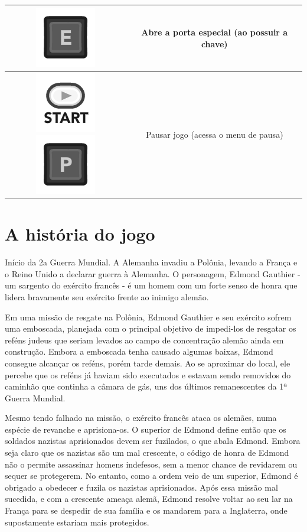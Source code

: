 \documentclass{article}
\begin{document}
\begin{longtable}{|c|c|}
\includegraphics[scale=0.3]{images/kE.png}
& Abre a porta especial (ao possuir a chave) 
\\
\hline
\includegraphics[scale=0.3]{images/360_Start.png}
\includegraphics[scale=0.3]{images/kP.png}
& Pausar jogo (acessa o menu de pausa)
\\
\hline
\end{longtable}

\section{A história do jogo}

   Início da 2a Guerra Mundial. A Alemanha invadiu a Polônia, levando a França e o Reino Unido a declarar guerra à Alemanha. O personagem, Edmond Gauthier - um sargento do exército francês - é um homem com um forte senso de honra que lidera bravamente seu exército frente ao inimigo alemão.
   
Em uma missão de resgate na Polônia, Edmond Gauthier e seu exército sofrem uma emboscada, planejada com o principal objetivo de impedi-los de resgatar os reféns judeus que seriam levados ao campo de concentração alemão ainda em construção. Embora a emboscada tenha causado algumas baixas, Edmond consegue alcançar os reféns, porém tarde demais. Ao se aproximar do local, ele percebe que os reféns já haviam sido executados e estavam sendo removidos do caminhão que continha a câmara de gás, uns dos últimos remanescentes da 1ª Guerra Mundial.
   
    Mesmo tendo falhado na missão, o exército francês ataca os alemães, numa espécie de revanche e  aprisiona-os. O superior de Edmond define então que os soldados nazistas aprisionados devem ser fuzilados, o que abala Edmond. Embora seja claro que os nazistas são um mal crescente, o código de honra de Edmond não o permite assassinar homens indefesos, sem a menor chance de revidarem ou sequer se protegerem. No entanto, como a ordem veio de um superior, Edmond é obrigado a obedecer e fuzila os nazistas aprisionados. Após essa missão mal sucedida, e com a crescente ameaça alemã, Edmond resolve voltar ao seu lar na França para se despedir de sua família e os mandarem para a Inglaterra, onde supostamente estariam mais protegidos.
    
\end{document}

